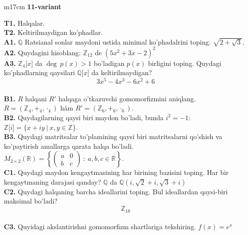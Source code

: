 \documentclass{article}
\begin{document}
\begin{tabular}{m{17cm}}
\textbf{11-variant}
\newline

\textbf{T1.} Halqalar. \\
\textbf{T2.} Keltirilmaydigan ko'phadlar. \\
\textbf{A1.} \(\mathbb{Q}\) Ratsianal sonlar maydoni ustida minimal ko'phadalrini toping.
\(\sqrt{2 + \sqrt{3}}\). \\
\textbf{A2.} Quydagini hisoblang:
\(\mathbb{Z}_{12}\) de \(\left( 5x^{2} + 3x - 2 \right)^{2}\) \\
\textbf{A3.} \(\mathbb{Z}_{4}\lbrack x\rbrack\) da \(\deg\ p(x) > 1\) bo'ladigan \(p(x)\) birligini toping. Quydagi ko'phadlarning qaysilari \(\mathbb{Q\lbrack}x\rbrack\) da keltirilmaydigan?
\[3x^{5} - 4x^{3} - 6x^{2} + 6\] \\
\textbf{B1.} \(R\) halqani \(R'\) halqaga o'tkazuvchi gomomorfizmini aniqlang.
\(R = (\mathbb{Z}_{4}, +_{4}, \cdot_{4})\) hám \(R' = (\mathbb{Z}_{6}, +_{6}, \cdot_{6})\). \\
\textbf{B2.} Quydagilarning qaysi biri maydon bo'ladi, bunda \(i^{2} = - 1\):
\(\mathbb{Z\lbrack}i\rbrack = \{ x + iy\ |\ x,y \in \mathbb{Z\}}\). \\
\textbf{B3.} Quydagi matritsalar to'plamining qaysi biri matritsalarni qo'shish va ko'paytirish amallarga qarata halqa bo'ladi.
\(M_{2 \times 2}\mathbb{(R) =}\left\{ \begin{pmatrix}
a & 0 \\
b & c
\end{pmatrix}\ :\ a,b,c \in \mathbb{R} \right\}\). \\
\textbf{C1.} Quydagi maydon kengaytmasining har birining bazisini toping. Har bir kengaytmaning darajasi qanday?
\(\mathbb{Q}\) da \(\mathbb{Q}\left( i,\sqrt{2} + i,\sqrt{3} + i \right)\) \\
\textbf{C2.} Quydagi halqaning barcha ideallarini toping. Bul ideallardan qaysi-biri maksimal bo'ladi?
\[\mathbb{Z}_{18}\] \\
\textbf{C3.} Quyidagi akslantirishni gomomorfizm shartlariga tekshiring. \(f(x) = e^{x}\) \\

\end{tabular}
\vspace{1cm}
\end{document}
